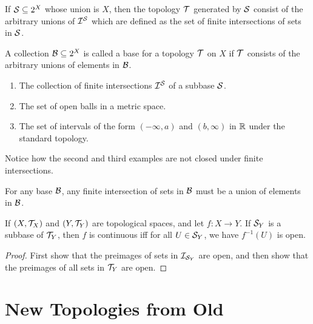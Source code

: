 \begin{proposition}
    If $\mathcal S \subseteq 2^X$ whose union is $X$, then the topology $\mathcal T$ generated by $\mathcal S$ consist of the arbitrary unions of $\mathcal I^{\mathcal S}$ which are defined as the set of finite intersections of sets in $\mathcal S$.
\end{proposition}

\begin{definition}[Base]
    A collection $\mathcal B \subseteq 2^X$ is called a base for a topology $\mathcal T$ on $X$ if $\mathcal T$ consists of the arbitrary unions of elements in $\mathcal B$.
\end{definition}

\begin{example}
    \begin{enumerate}
        \item The collection of finite intersections $\mathcal I^{\mathcal S}$ of a subbase $\mathcal S$.
        \item The set of open balls in a metric space.
        \item The set of intervals of the form $(-\infty, a)$ and $(b, \infty)$ in $\mathbb R$ under the standard topology.
    \end{enumerate}
\end{example}

Notice how the second and third examples are not closed under finite intersections. 

\begin{proposition}
    For any base $\mathcal B$, any finite intersection of sets in $\mathcal B$ must be a union of elements in $\mathcal B$.
\end{proposition}

\begin{proposition}
    \label{prop:subbasecontinuity}
    If $(X, \mathcal T_X)$ and $(Y, \mathcal T_Y)$ are topological spaces, and let $f \colon X \to Y$. If $\mathcal S_Y$ is a subbase of $\mathcal T_Y$, then $f$ is continuous iff for all $U \in \mathcal S_Y$, we have $f^{-1}(U)$ is open.
\end{proposition}

\begin{proof}
    First show that the preimages of sets in $\mathcal I_{\mathcal S_Y}$ are open, and then show that the preimages of all sets in $\mathcal T_Y$ are open.
\end{proof}

\section{New Topologies from Old}

